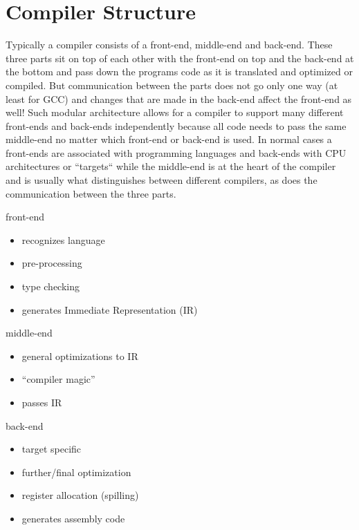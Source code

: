 \chapter{Compiler Structure}
\label{chapter:compiler structure}
Typically a compiler consists of a front-end, middle-end and back-end. These three parts sit on top of each other with the front-end on top and the back-end at the bottom and pass down the programs code as it is translated and optimized or compiled. But communication between the parts does not go only one way (at least for GCC)
and changes that are made in the back-end affect the front-end as well!
Such modular architecture  allows for a compiler to support many different front-ends and back-ends independently because all code needs to pass the same middle-end no matter which front-end or back-end is used. In normal cases a front-ends are associated with programming languages and back-ends with CPU architectures or ``targets`` while the middle-end is at the heart of the compiler and is usually what distinguishes between different compilers, as does the communication between the three parts.
  
\begin{myexampleblock}{front-end}
	\begin{itemize}
		\item recognizes language
		\item pre-processing
		\item type checking
		\item generates Immediate Representation (IR)
	\end{itemize}
\end{myexampleblock}
\begin{myexampleblock}{middle-end}
	\begin{itemize}
		\item general optimizations to IR
		\item ``compiler magic''
		\item passes IR
	\end{itemize}
\end{myexampleblock}
\begin{myexampleblock}{back-end}
	\begin{itemize}
		\item target specific
		\item further/final optimization
		\item register allocation (spilling)
		\item generates assembly code
	\end{itemize}
\end{myexampleblock}



